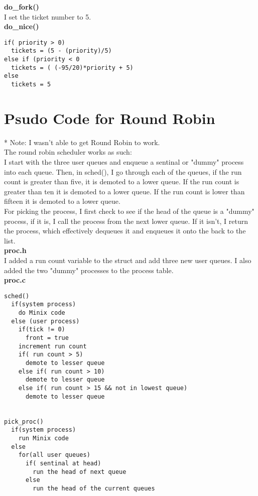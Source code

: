 \documentclass[a4paper, 12pt]{article}
\begin{document}
\noindent
{\bf do\_fork()} \\
I set the ticket number to 5. \\

\noindent
{\bf do\_nice()} \\

\begin{verbatim}
if( priority > 0)
  tickets = (5 - (priority)/5)
else if (priority < 0
  tickets = ( (-95/20)*priority + 5)
else
  tickets = 5

\end{verbatim}

\section{Psudo Code for Round Robin}

* Note: I wasn't able to get Round Robin to work. \\
The round robin scheduler works as such: \\
I start with the three user queues and enqueue a sentinal or "dummy" process into each queue. Then, in sched(), I go through each of the queues, if the run count is greater than five, it is demoted to a lower queue. If the run count is greater than ten it is demoted to a lower queue. If the run count is lower than fifteen it is demoted to a lower queue. \\
For picking the process, I first check to see if the head of the queue is a "dummy" process, if it is, I call the process from the next lower queue. If it isn't, I return the process, which effectively dequeues it and enqueues it onto the back to the list. \\

{\bf proc.h} \\
I added a run count variable to the struct and add three new user queues. I also added the two "dummy" processes to the process table. \\

{\bf proc.c} \\


\begin{verbatim}
sched()
  if(system process)
    do Minix code
  else (user process)
    if(tick != 0)
      front = true
    increment run count
    if( run count > 5)
      demote to lesser queue
    else if( run count > 10)
      demote to lesser queue
    else if( run count > 15 && not in lowest queue)
      demote to lesser queue


pick_proc()
  if(system process)
    run Minix code
  else
    for(all user queues)
      if( sentinal at head)
        run the head of next queue
      else
        run the head of the current queues

\end{verbatim}
\end{document}
